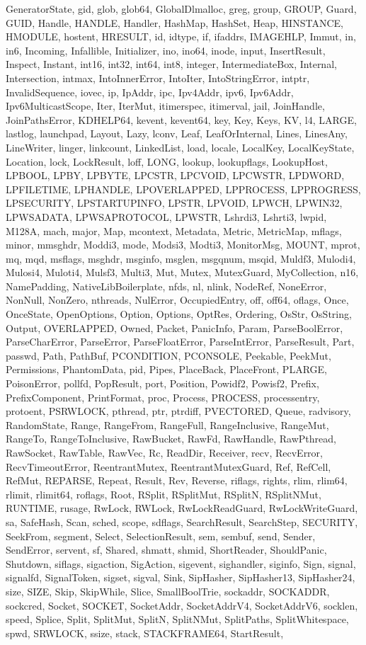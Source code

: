 {{GeneratorState, gid, glob, glob64, GlobalDlmalloc, greg, group, GROUP, Guard, GUID, Handle, HANDLE, Handler, HashMap, HashSet, Heap, HINSTANCE, HMODULE, hostent, HRESULT, id, idtype, if, ifaddrs, IMAGEHLP, Immut, in, in6, Incoming, Infallible, Initializer, ino, ino64, inode, input, InsertResult, Inspect, Instant, int16, int32, int64, int8, integer, IntermediateBox, Internal, Intersection, intmax, IntoInnerError, IntoIter, IntoStringError, intptr, InvalidSequence, iovec, ip, IpAddr, ipc, Ipv4Addr, ipv6, Ipv6Addr, Ipv6MulticastScope, Iter, IterMut, itimerspec, itimerval, jail, JoinHandle, JoinPathsError, KDHELP64, kevent, kevent64, key, Key, Keys, KV, l4, LARGE, lastlog, launchpad, Layout, Lazy, lconv, Leaf, LeafOrInternal, Lines, LinesAny, LineWriter, linger, linkcount, LinkedList, load, locale, LocalKey, LocalKeyState, Location, lock, LockResult, loff, LONG, lookup, lookupflags, LookupHost, LPBOOL, LPBY, LPBYTE, LPCSTR, LPCVOID, LPCWSTR, LPDWORD, LPFILETIME, LPHANDLE, LPOVERLAPPED, LPPROCESS, LPPROGRESS, LPSECURITY, LPSTARTUPINFO, LPSTR, LPVOID, LPWCH, LPWIN32, LPWSADATA, LPWSAPROTOCOL, LPWSTR, Lshrdi3, Lshrti3, lwpid, M128A, mach, major, Map, mcontext, Metadata, Metric, MetricMap, mflags, minor, mmsghdr, Moddi3, mode, Modsi3, Modti3, MonitorMsg, MOUNT, mprot, mq, mqd, msflags, msghdr, msginfo, msglen, msgqnum, msqid, Muldf3, Mulodi4, Mulosi4, Muloti4, Mulsf3, Multi3, Mut, Mutex, MutexGuard, MyCollection, n16, NamePadding, NativeLibBoilerplate, nfds, nl, nlink, NodeRef, NoneError, NonNull, NonZero, nthreads, NulError, OccupiedEntry, off, off64, oflags, Once, OnceState, OpenOptions, Option, Options, OptRes, Ordering, OsStr, OsString, Output, OVERLAPPED, Owned, Packet, PanicInfo, Param, ParseBoolError, ParseCharError, ParseError, ParseFloatError, ParseIntError, ParseResult, Part, passwd, Path, PathBuf, PCONDITION, PCONSOLE, Peekable, PeekMut, Permissions, PhantomData, pid, Pipes, PlaceBack, PlaceFront, PLARGE, PoisonError, pollfd, PopResult, port, Position, Powidf2, Powisf2, Prefix, PrefixComponent, PrintFormat, proc, Process, PROCESS, processentry, protoent, PSRWLOCK, pthread, ptr, ptrdiff, PVECTORED, Queue, radvisory, RandomState, Range, RangeFrom, RangeFull, RangeInclusive, RangeMut, RangeTo, RangeToInclusive, RawBucket, RawFd, RawHandle, RawPthread, RawSocket, RawTable, RawVec, Rc, ReadDir, Receiver, recv, RecvError, RecvTimeoutError, ReentrantMutex, ReentrantMutexGuard, Ref, RefCell, RefMut, REPARSE, Repeat, Result, Rev, Reverse, riflags, rights, rlim, rlim64, rlimit, rlimit64, roflags, Root, RSplit, RSplitMut, RSplitN, RSplitNMut, RUNTIME, rusage, RwLock, RWLock, RwLockReadGuard, RwLockWriteGuard, sa, SafeHash, Scan, sched, scope, sdflags, SearchResult, SearchStep, SECURITY, SeekFrom, segment, Select, SelectionResult, sem, sembuf, send, Sender, SendError, servent, sf, Shared, shmatt, shmid, ShortReader, ShouldPanic, Shutdown, siflags, sigaction, SigAction, sigevent, sighandler, siginfo, Sign, signal, signalfd, SignalToken, sigset, sigval, Sink, SipHasher, SipHasher13, SipHasher24, size, SIZE, Skip, SkipWhile, Slice, SmallBoolTrie, sockaddr, SOCKADDR, sockcred, Socket, SOCKET, SocketAddr, SocketAddrV4, SocketAddrV6, socklen, speed, Splice, Split, SplitMut, SplitN, SplitNMut, SplitPaths, SplitWhitespace, spwd, SRWLOCK, ssize, stack, STACKFRAME64, StartResult, }}
